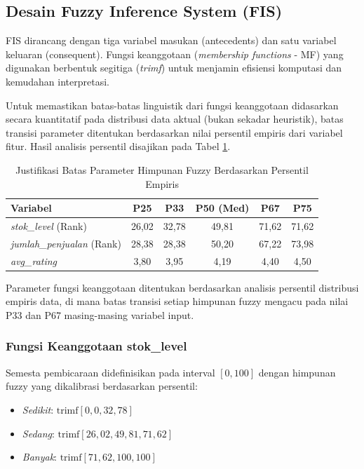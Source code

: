 \documentclass[conference]{IEEEtran}
\begin{document}
\subsection{Desain Fuzzy Inference System (FIS)}
FIS dirancang dengan tiga variabel masukan (antecedents) dan satu variabel keluaran (consequent). Fungsi keanggotaan (\textit{membership functions} - MF) yang digunakan berbentuk segitiga (\textit{trimf}) untuk menjamin efisiensi komputasi dan kemudahan interpretasi.

Untuk memastikan batas-batas linguistik dari fungsi keanggotaan didasarkan secara kuantitatif pada distribusi data aktual (bukan sekadar heuristik), batas transisi parameter ditentukan berdasarkan nilai persentil empiris dari variabel fitur. Hasil analisis persentil disajikan pada Tabel \ref{tab:percentiles}.

\begin{table}[h]
\caption{Justifikasi Batas Parameter Himpunan Fuzzy Berdasarkan Persentil Empiris}
\label{tab:percentiles}
\centering
\begin{tabular}{lccccc}
\toprule
\textbf{Variabel} & \textbf{P25} & \textbf{P33} & \textbf{P50 (Med)} & \textbf{P67} & \textbf{P75} \\
\midrule
\textit{stok\_level} (Rank) & 26,02 & 32,78 & 49,81 & 71,62 & 71,62 \\
\textit{jumlah\_penjualan} (Rank) & 28,38 & 28,38 & 50,20 & 67,22 & 73,98 \\
\textit{avg\_rating} & 3,80 & 3,95 & 4,19 & 4,40 & 4,50 \\
\bottomrule
\end{tabular}
\end{table}

Parameter fungsi keanggotaan ditentukan berdasarkan analisis persentil distribusi empiris data, di mana batas transisi setiap himpunan fuzzy mengacu pada nilai P33 dan P67 masing-masing variabel input.

\subsubsection{Fungsi Keanggotaan stok\_level}
Semesta pembicaraan didefinisikan pada interval $[0, 100]$ dengan himpunan fuzzy yang dikalibrasi berdasarkan persentil:
\begin{itemize}
    \item \textit{Sedikit}: $\text{trimf}[0, 0, 32,78]$
    \item \textit{Sedang}: $\text{trimf}[26,02, 49,81, 71,62]$
    \item \textit{Banyak}: $\text{trimf}[71,62, 100, 100]$
\end{itemize}
\end{document}
